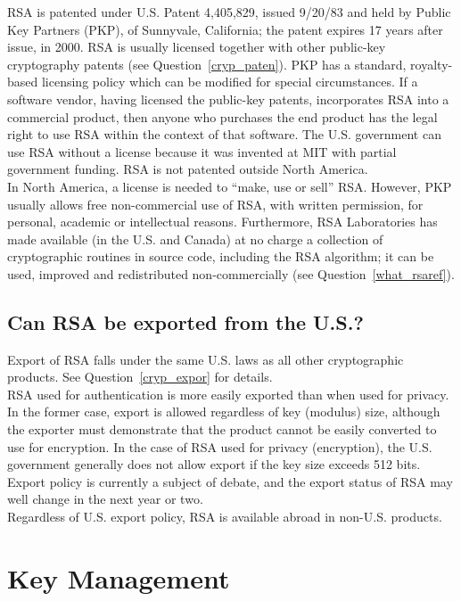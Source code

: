 RSA is patented under U.S. Patent 4,405,829, issued 9/20/83 and held by
Public Key Partners (PKP), of Sunnyvale, California; the patent expires 17
years after issue, in 2000. RSA is usually licensed together with other
public-key cryptography patents (see Question~\ref{cryp_paten}). PKP has a
standard, royalty-based licensing policy which can be modified for special
circumstances. If a software vendor, having licensed the public-key
patents, incorporates RSA into a commercial product, then anyone who
purchases the end product has the legal right to use RSA within the context
of that software. The U.S. government can use RSA without a license because
it was invented at MIT with partial government funding. RSA is not patented
outside North America.\\

In North America, a license is needed to ``make, use or sell'' RSA.
However, PKP usually allows free non-commercial use of RSA, with
written permission, for personal, academic or intellectual reasons.
Furthermore, RSA Laboratories has made available (in the U.S. and
Canada) at no charge a collection of cryptographic routines in source
code, including the RSA algorithm; it can be used, improved and
redistributed non-commercially (see Question~\ref{what_rsaref}).

\subsection{Can RSA be exported from the U.S.?}

Export of RSA falls under the same U.S. laws as all other cryptographic
products. See Question~\ref{cryp_expor} for details.\\

RSA used for authentication is more easily exported than when used for
privacy. In the former case, export is allowed regardless of key
(modulus) size, although the exporter must demonstrate that the product
cannot be easily converted to use for encryption. In the case of RSA
used for privacy (encryption), the U.S. government generally does not
allow export if the key size exceeds 512 bits. Export policy is
currently a subject of debate, and the export status of RSA may well
change in the next year or two.\\

Regardless of U.S. export policy, RSA is available abroad in non-U.S.
products.


\section{Key Management}
\label{sec:keymgt}
